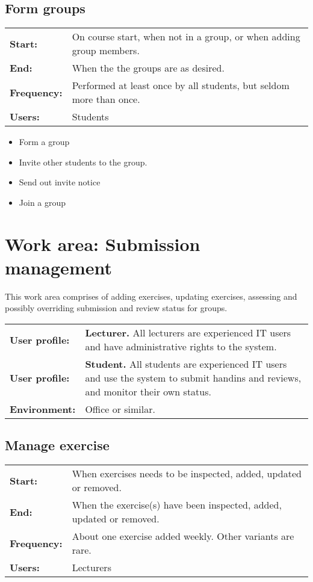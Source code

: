 \documentclass[Main]{subfiles}
\begin{document}
\subsection{Form groups}

\begin{longtable}{l p{13cm}}
 \textbf{Start:} & On course start, when not in a group, or when adding group members. \\
 \textbf{End:} & When the the groups are as desired.  \\
 \textbf{Frequency:} & Performed at least once by all students, but seldom more than once. \\
 \textbf{Users:} & Students \\
\end{longtable}

\begin{itemize}
\item Form a group
\item Invite other students to the group.
\item Send out invite notice
\item Join a group
\end{itemize}

\section{Work area: Submission management}
This work area comprises of adding exercises, updating exercises, assessing and possibly overriding submission and review status for groups.

\begin{tabular}{l  p{13cm}}
 \textbf{User profile:} & \textbf{Lecturer.} All lecturers are experienced IT users and have administrative rights to the system. \\
 \textbf{User profile:} & \textbf{Student.} All students are experienced IT users and use the system to submit handins and reviews, and monitor their own status.  \\
 \textbf{Environment:} & Office or similar.
\end{tabular}

\subsection{Manage exercise}

\begin{longtable}{l p{13cm}}
 \textbf{Start:} & When exercises needs to be inspected, added, updated or removed. \\
 \textbf{End:} & When the exercise(s) have been inspected, added, updated or removed.  \\
 \textbf{Frequency:} & About one exercise added weekly. Other variants are rare. \\
 \textbf{Users:} & Lecturers \\
\end{longtable}
\end{document}
